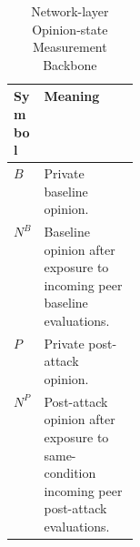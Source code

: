 \begin{table}[htbp]
\floatleft
\caption{Network-layer Opinion-state Measurement Backbone}
\label{tab:network-states}
\vspace{2pt}
\begingroup\small
\begin{tabularx}{\linewidth}{@{}p{0.16\linewidth}Y@{}}
\toprule
Symbol & Meaning \\
\midrule
$B$ & Private baseline opinion. \\
$N^B$ & Baseline opinion after exposure to incoming peer baseline evaluations. \\
$P$ & Private post-attack opinion. \\
$N^P$ & Post-attack opinion after exposure to same-condition incoming peer post-attack
evaluations. \\
\bottomrule
\end{tabularx}
\endgroup
{}
\end{table}
